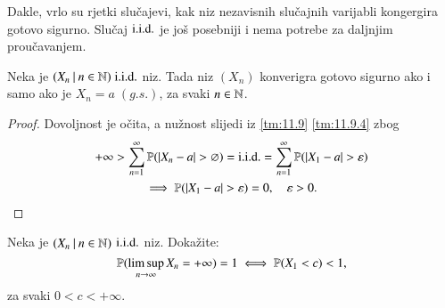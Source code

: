 Dakle, vrlo su rjetki slu\v cajevi, kak niz nezavisnih slu\v cajnih varijabli kongergira gotovo sigurno.
Slu\v caj $\mathrm{i.i.d.}$ je jo\v s posebniji i nema potrebe za daljnjim prou\v cavanjem.

\begin{kor} \label{kor:11.10}
    Neka je $({X_n} \: | \: {n \in \mathbb{N}}) \; \mathrm{i.i.d.}$ niz.
    Tada niz $(X_n)$ konverigra gotovo sigurno ako i samo ako je $X_n = a \; (g.s.)$, za svaki $n \in \mathbb{N}$.
\end{kor}

\begin{proof}
    Dovoljnost je o\v cita, a nu\v znost slijedi iz \ref{tm:11.9} \ref{tm:11.9.4} zbog
    \begin{equation*}
        \begin{gathered}
            +\infty > \suma{n = 1}{\infty} \vjeroj{|X_n - a|>\varnothing} = \iid = \suma{n = 1}{\infty} \vjeroj{|X_1 - a|> \varepsilon}\\
            \implies \vjeroj{|X_1 - a| > \varepsilon} = 0, \quad \varepsilon > 0.
        \end{gathered}
    \end{equation*}
\end{proof}

\begin{zad} \label{zad:11.11}
    Neka je $({X_n} \: | \: {n \in \mathbb{N}})$ $\mathrm{i.i.d.}$ niz.
    Doka\v zite:
    \begin{equation*}
        \mathbb{P}({\limsup\limits_{n \to \infty} X_n  = +\infty}) = 1 \iff \mathbb{P}({X_1 < c}) < 1,
    \end{equation*}
    za svaki $0 < c < +\infty$.
\end{zad}